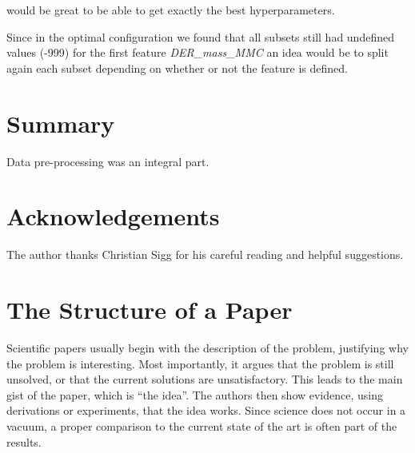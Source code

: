 \documentclass[10pt,conference,compsocconf]{IEEEtran}
\begin{document}
would be great to be able to get exactly the best hyperparameters. 

Since in the optimal configuration we found that all subsets still had undefined values (-999) for the first feature \textit{DER\_mass\_MMC} an idea would be to split again each subset
depending on whether or not the feature is defined.

\section{Summary}

Data pre-processing was an integral part. 

\section*{Acknowledgements}
The author thanks Christian Sigg for his careful reading and helpful
suggestions.

\pagebreak
\section{The Structure of a Paper}
\label{sec:structure-paper}
Scientific papers usually begin with the description of the problem,
justifying why the problem is interesting. Most importantly, it argues
that the problem is still unsolved, or that the current solutions are
unsatisfactory. This leads to the main gist of the paper, which is
``the idea''. The authors then show evidence, using derivations or
experiments, that the idea works. Since science does not occur in a
vacuum, a proper comparison to the current state of the art is often
part of the results.
\end{document}
